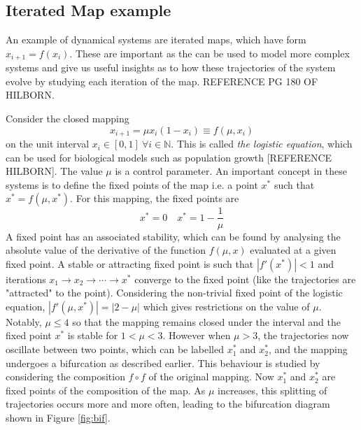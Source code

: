 \documentclass[12pt,a4paper]{amsart}
\begin{document}
\subsection{Iterated Map example}

An example of dynamical systems are iterated maps, which have form $x_{i+1} = f(x_{i})$. These are important as the can be used to model more complex systems and give us useful insights as to how these trajectories of the system evolve by studying each iteration of the map. REFERENCE PG 180 OF HILBORN.

Consider the closed mapping $$x_{i+1} = {\mu} x_{i} (1 - x_{i}) \equiv f(\mu, x_{i})$$ on the unit interval $x_{i} \in [0, 1] \  {\forall}i \in \mathbb{N}$. This is called \textit{the logistic equation}, which can be used for biological models such as population growth [REFERENCE HILBORN]. The value $\mu$ is a control parameter. An important concept in these systems is to define the fixed points of the map i.e. a point $x^{*}$ such that $x^{*} = f(\mu, x^{*})$. For this mapping, the fixed points are $$x^{*} = 0 \quad x^{*} = 1 - \frac{1}{\mu}$$ A fixed point has an associated stability, which can be found by analysing the absolute value of the derivative of the function $f(\mu, x)$ evaluated at a given fixed point. A stable or attracting fixed point is such that $|f'(x^{*})| < 1$ and iterations $x_{1} \rightarrow x_{2} \rightarrow \cdots \rightarrow x^{*}$ converge to the fixed point (like the trajectories are "attracted" to the point). Considering the non-trivial fixed point of the logistic equation, $|f'(\mu, x^{*})| = |2 - \mu|$ which gives restrictions on the value of $\mu$. Notably, $\mu \leq 4$ so that the mapping remains closed under the interval and the fixed point $x^{*}$ is stable for $1 < \mu < 3$. However when $\mu > 3$, the trajectories now oscillate between two points, which can be labelled $x_{1}^{*}$ and $x_{2}^{*}$, and the mapping undergoes a bifurcation as described earlier. This behaviour is studied by considering the composition $f \circ f$ of the original mapping. Now $x_{1}^{*}$ and $x_{2}^{*}$ are fixed points of the composition of the map. As $\mu$ increases, this splitting of trajectories occurs more and more often, leading to the bifurcation diagram shown in Figure \ref{fig:bif}.
\end{document}
